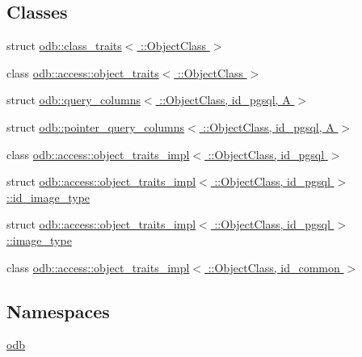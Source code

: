 \subsection*{Classes}
\begin{DoxyCompactItemize}
\item 
struct \hyperlink{structodb_1_1class__traits_3_01_1_1_object_class_01_4}{odb\+::class\+\_\+traits$<$ \+::\+Object\+Class $>$}
\item 
class \hyperlink{classodb_1_1access_1_1object__traits_3_01_1_1_object_class_01_4}{odb\+::access\+::object\+\_\+traits$<$ \+::\+Object\+Class $>$}
\item 
struct \hyperlink{structodb_1_1query__columns_3_01_1_1_object_class_00_01id__pgsql_00_01_a_01_4}{odb\+::query\+\_\+columns$<$ \+::\+Object\+Class, id\+\_\+pgsql, A $>$}
\item 
struct \hyperlink{structodb_1_1pointer__query__columns_3_01_1_1_object_class_00_01id__pgsql_00_01_a_01_4}{odb\+::pointer\+\_\+query\+\_\+columns$<$ \+::\+Object\+Class, id\+\_\+pgsql, A $>$}
\item 
class \hyperlink{classodb_1_1access_1_1object__traits__impl_3_01_1_1_object_class_00_01id__pgsql_01_4}{odb\+::access\+::object\+\_\+traits\+\_\+impl$<$ \+::\+Object\+Class, id\+\_\+pgsql $>$}
\item 
struct \hyperlink{structodb_1_1access_1_1object__traits__impl_3_01_1_1_object_class_00_01id__pgsql_01_4_1_1id__image__type}{odb\+::access\+::object\+\_\+traits\+\_\+impl$<$ \+::\+Object\+Class, id\+\_\+pgsql $>$\+::id\+\_\+image\+\_\+type}
\item 
struct \hyperlink{structodb_1_1access_1_1object__traits__impl_3_01_1_1_object_class_00_01id__pgsql_01_4_1_1image__type}{odb\+::access\+::object\+\_\+traits\+\_\+impl$<$ \+::\+Object\+Class, id\+\_\+pgsql $>$\+::image\+\_\+type}
\item 
class \hyperlink{classodb_1_1access_1_1object__traits__impl_3_01_1_1_object_class_00_01id__common_01_4}{odb\+::access\+::object\+\_\+traits\+\_\+impl$<$ \+::\+Object\+Class, id\+\_\+common $>$}
\end{DoxyCompactItemize}
\subsection*{Namespaces}
\begin{DoxyCompactItemize}
\item 
 \hyperlink{namespaceodb}{odb}
\end{DoxyCompactItemize}
